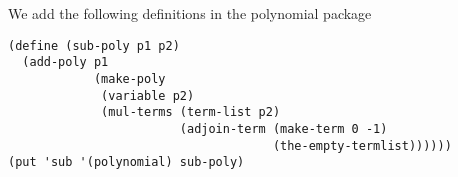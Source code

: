\documentclass[a4paper,12pt]{article}
\begin{document}
We add the following definitions in the polynomial package
\begin{lstlisting}
(define (sub-poly p1 p2)
  (add-poly p1
            (make-poly
             (variable p2)
             (mul-terms (term-list p2)
                        (adjoin-term (make-term 0 -1)
                                     (the-empty-termlist))))))
(put 'sub '(polynomial) sub-poly)
\end{lstlisting}
\end{document}
